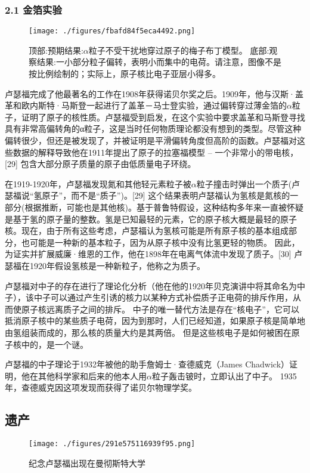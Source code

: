 \subsubsection{2.1 金箔实验}
\begin{figure}[ht]
\centering
\texttt{[image: ./figures/fbafd84f5eca4492.png]}
\caption{顶部:预期结果:$\alpha$粒子不受干扰地穿过原子的梅子布丁模型。 底部:观察结果:一小部分粒子偏转，表明小而集中的电荷。请注意，图像不是按比例绘制的；实际上，原子核比电子亚层小得多。} \label{fig_Ernest_5}
\end{figure}
卢瑟福完成了他最著名的工作在1908年获得诺贝尔奖之后。1909年，他与汉斯·盖革和欧内斯特·马斯登一起进行了盖革－马士登实验，通过偏转穿过薄金箔的$\alpha$粒子，证明了原子的核性质。卢瑟福受到启发，在这个实验中要求盖革和马斯登寻找具有非常高偏转角的α粒子，这是当时任何物质理论都没有想到的类型。尽管这种偏转很少，但还是被发现了，并被证明是平滑偏转角度但高阶的函数。卢瑟福对这些数据的解释导致他在1911年提出了原子的拉塞福模型 – 一个非常小的带电核，[29] 包含大部分原子质量的原子由低质量电子环绕。

在1919-1920年，卢瑟福发现氮和其他轻元素粒子被$\alpha$粒子撞击时弹出一个质子(卢瑟福说“氢原子”，而不是“质子”)。[29] 这个结果表明卢瑟福认为氢核是氮核的一部分(根据推断，可能也是其他核)。基于普鲁特假设，这种结构多年来一直被怀疑是基于氢的原子量的整数。氢是已知最轻的元素，它的原子核大概是最轻的原子核。现在，由于所有这些考虑，卢瑟福认为氢核可能是所有原子核的基本组成部分，也可能是一种新的基本粒子，因为从原子核中没有比氢更轻的物质。 因此，为证实并扩展威廉·维恩的工作，他在1898年在电离气体流中发现了质子。[30] 卢瑟福在1920年假设氢核是一种新粒子，他称之为质子。

卢瑟福对中子的存在进行了理论化分析（他在他的1920年贝克演讲中将其命名为中子），该中子可以通过产生引诱的核力以某种方式补偿质子正电荷的排斥作用，从而使原子核远离质子之间的排斥。 中子的唯一替代方法是存在“核电子”，它可以抵消原子核中的某些质子电荷，因为到那时，人们已经知道，如果原子核是简单地由氢组装而成的，那么核的质量大约是其两倍。 但是这些核电子是如何被困在原子核中的，是一个谜。

卢瑟福的中子理论于1932年被他的助手詹姆士·查德威克（James Chadwick）证明，他在其他科学家和后来的他本人用$\alpha$粒子轰击铍时，立即认出了中子。 1935年，查德威克因这项发现而获得了诺贝尔物理学奖。

\subsection{遗产}
\begin{figure}[ht]
\centering
\texttt{[image: ./figures/291e575116939f95.png]}
\caption{纪念卢瑟福出现在曼彻斯特大学} \label{fig_Ernest_6}
\end{figure}

